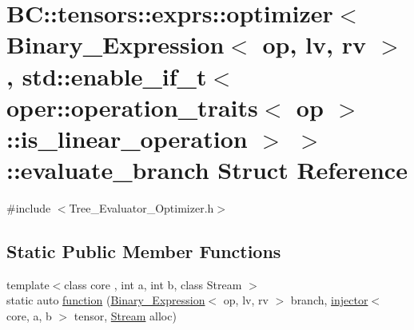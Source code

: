 \hypertarget{structBC_1_1tensors_1_1exprs_1_1optimizer_3_01Binary__Expression_3_01op_00_01lv_00_01rv_01_4_00_6a19fcc06d75e5982db96f21da6252c0}{}\section{BC\+:\+:tensors\+:\+:exprs\+:\+:optimizer$<$ Binary\+\_\+\+Expression$<$ op, lv, rv $>$, std\+:\+:enable\+\_\+if\+\_\+t$<$ oper\+:\+:operation\+\_\+traits$<$ op $>$\+:\+:is\+\_\+linear\+\_\+operation $>$ $>$\+:\+:evaluate\+\_\+branch Struct Reference}
\label{structBC_1_1tensors_1_1exprs_1_1optimizer_3_01Binary__Expression_3_01op_00_01lv_00_01rv_01_4_00_6a19fcc06d75e5982db96f21da6252c0}


{\ttfamily \#include $<$Tree\+\_\+\+Evaluator\+\_\+\+Optimizer.\+h$>$}

\subsection*{Static Public Member Functions}
\begin{DoxyCompactItemize}
\item 
{\footnotesize template$<$class core , int a, int b, class Stream $>$ }\\static auto \hyperlink{structBC_1_1tensors_1_1exprs_1_1optimizer_3_01Binary__Expression_3_01op_00_01lv_00_01rv_01_4_00_6a19fcc06d75e5982db96f21da6252c0_ac4cf5d66a6f998e93a7de3da2b2fe416}{function} (\hyperlink{structBC_1_1tensors_1_1exprs_1_1Binary__Expression}{Binary\+\_\+\+Expression}$<$ op, lv, rv $>$ branch, \hyperlink{structBC_1_1tensors_1_1exprs_1_1injector}{injector}$<$ core, a, b $>$ tensor, \hyperlink{namespaceBC_abc64a63cd29a22d102a68f478dfd588d}{Stream} alloc)
\end{DoxyCompactItemize}


